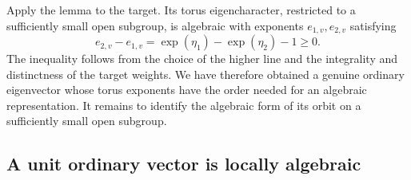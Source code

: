 Apply the lemma to the target.  Its torus eigencharacter, restricted
to a sufficiently small open subgroup, is algebraic with exponents
$e_{1,v},e_{2,v}$ satisfying
\begin{equation}\label{eq:nonnegative-algebraic-degree}
 e_{2,v}-e_{1,v}
   =\operatorname{exp}(\eta_1)-\operatorname{exp}(\eta_2)-1\ge0.
\end{equation}
The inequality follows from the choice of the higher line and the
integrality and distinctness of the target weights.
We have therefore obtained a genuine ordinary eigenvector whose torus
exponents have the order needed for an algebraic representation.  It
remains to identify the algebraic form of its orbit on a sufficiently
small open subgroup.

\subsection{A unit ordinary vector is locally algebraic}

